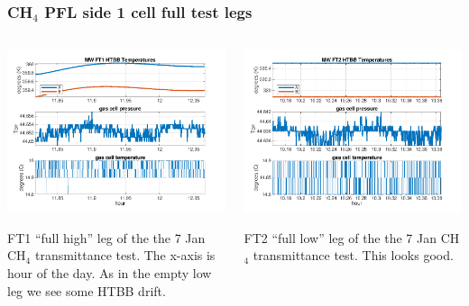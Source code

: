 \documentclass[10pt]{beamer}
\begin{document}
\begin{frame}
\frametitle{CH$_4$ PFL side 1 cell full test legs}
\begin{columns}[t]
\begin{column}{0.5\textwidth}
  \begin{centering}
  \includegraphics[width=\textwidth]{harvest_01-07/01-07_MW_FT1.png}
  \end{centering}\vspace{3mm}

  FT1 ``full high'' leg of the the 7 Jan CH$_4$ transmittance test.
  The x-axis is hour of the day.  As in the empty low leg we see
  some HTBB drift.

\end{column}
\begin{column}{0.5\textwidth}  
  \begin{centering}
  \includegraphics[width=\textwidth]{harvest_01-07/01-07_MW_FT2.png}
  \end{centering}\vspace{3mm}

  FT2 ``full low'' leg of the the 7 Jan CH$_4$ transmittance test.
  This looks good.

\end{column}
\end{columns}
\end{frame}
\end{document}
